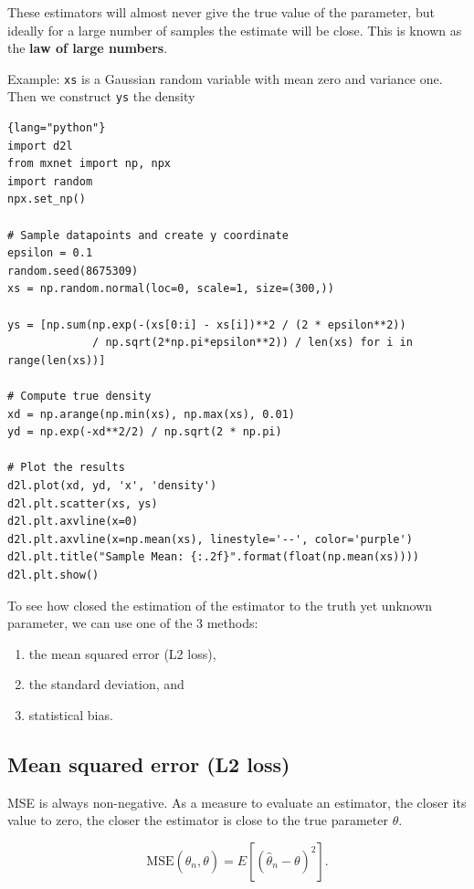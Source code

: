 These estimators will almost never give the true value of the parameter, but
ideally for a large number of samples the estimate will be close.
This is known as the {\bf law of large numbers}.

Example: \verb!xs! is a Gaussian random variable with mean zero and variance one.
Then we construct \verb!ys! the density 
\begin{lstlisting}{lang="python"}
import d2l
from mxnet import np, npx
import random
npx.set_np()

# Sample datapoints and create y coordinate
epsilon = 0.1
random.seed(8675309)
xs = np.random.normal(loc=0, scale=1, size=(300,))

ys = [np.sum(np.exp(-(xs[0:i] - xs[i])**2 / (2 * epsilon**2))
             / np.sqrt(2*np.pi*epsilon**2)) / len(xs) for i in range(len(xs))]

# Compute true density
xd = np.arange(np.min(xs), np.max(xs), 0.01)
yd = np.exp(-xd**2/2) / np.sqrt(2 * np.pi)

# Plot the results
d2l.plot(xd, yd, 'x', 'density')
d2l.plt.scatter(xs, ys)
d2l.plt.axvline(x=0)
d2l.plt.axvline(x=np.mean(xs), linestyle='--', color='purple')
d2l.plt.title("Sample Mean: {:.2f}".format(float(np.mean(xs))))
d2l.plt.show()
\end{lstlisting}

To see how closed the estimation of the estimator to the truth yet unknown parameter, we can use one of the 3 methods:
\begin{enumerate}
  \item  the mean squared error (L2 loss), 
  
  \item the standard deviation, and 
  
  \item statistical bias.
\end{enumerate}

\subsection{Mean squared error (L2 loss)}
\label{sec:loss-L2-loss}
\label{sec:mean-squared-error}

MSE is always non-negative.
As a measure to evaluate an estimator, the closer its value to zero, the closer
the estimator is close to the true parameter $\theta$.

\begin{equation}
\mathrm{MSE} (\hat{\theta}_n, \theta) = E[(\hat{\theta}_n - \theta)^2].
\end{equation}

